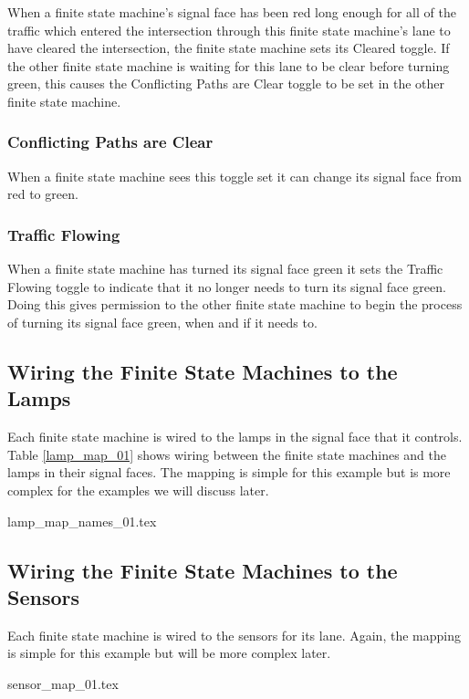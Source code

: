 \documentclass[letterpaper,twoside]{article}
\begin{document}
When a finite state machine's signal face has been red long enough for all
of the traffic which entered the intersection through this finite state
machine's lane to have cleared the intersection, the finite state machine
sets its Cleared toggle.
If the other finite state machine is waiting for this lane to be clear
before turning green, this causes the Conflicting Paths are Clear toggle
to be set in the other finite state machine.

\subsubsection{Conflicting Paths are Clear}

When a finite state machine sees this toggle set it can change its signal
face from red to green.

\subsubsection{Traffic Flowing}

When a finite state machine has turned its signal face green it sets the
Traffic Flowing toggle to indicate that it no longer needs to turn
its signal face green.
Doing this gives permission to the other finite state machine to begin the
process of turning its signal face green, when and if it needs to.

\subsection{Wiring the Finite State Machines to the Lamps}

Each finite state machine is wired to the lamps in the
signal face that it controls.
Table \ref{lamp_map_01} shows wiring between the
finite state machines and the lamps in their signal faces.
The mapping is simple for this example but is more complex
for the examples we will discuss later.

 {lamp_map_names_01.tex}

\subsection{Wiring the Finite State Machines to the Sensors}

Each finite state machine is wired to the sensors
for its lane.  Again, the mapping is simple for this example
but will be more complex later.

 {sensor_map_01.tex}
\end{document}
